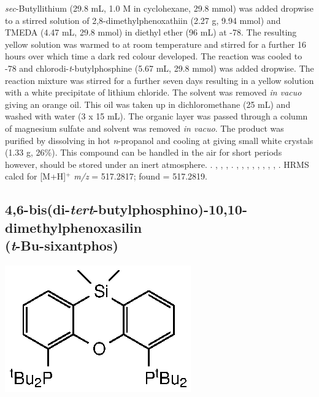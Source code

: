\noindent{}\emph{sec}-Butyllithium (29.8 mL, 1.0 M in cyclohexane, 29.8 mmol) was added dropwise to a stirred solution of 2,8-dimethylphenoxathiin (2.27 g, 9.94 mmol) and TMEDA (4.47 mL, 29.8 mmol) in diethyl ether (96 mL) at -78\degC{}.  The resulting yellow solution was warmed to at room temperature and stirred for a further 16 hours over which time a dark red colour developed.  The reaction was cooled to -78\degC{} and chlorodi-\emph{t}-butylphosphine (5.67 mL, 29.8 mmol) was added dropwise.  The reaction mixture was stirred for a further seven days resulting in a yellow solution with a white precipitate of lithium chloride.  The solvent was removed \emph{in vacuo} giving an orange oil.  This oil was taken up in dichloromethane (25 mL) and washed with water (3 x 15 mL).  The organic layer was passed through a column of magnesium sulfate and solvent was removed \emph{in vacuo}.  The product was purified by dissolving in hot \emph{n}-propanol and cooling at  giving small white crystals (1.33 g, 26\%).  This compound can be handled in the air for short periods however, should be stored under an inert atmosphere.
.
,
,
,
.
,
,
,
,
,
,
,
,
.
HRMS calcd for  [M+H]$^+$ \emph{m/z} = 517.2817; found = 517.2819.

\subsection*{4,6-bis(di-\emph{tert}-butylphosphino)-10,10-dimethylphenoxasilin \\(\emph{t}-Bu-sixantphos)}

\begin{structure}[h]
\begin{center}
\includegraphics{../Structures/SitBuligand.eps}
\end{center}
\end{structure}

